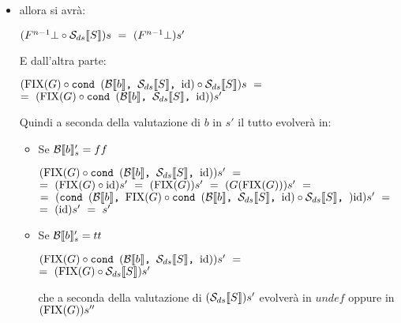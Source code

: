 {\begin{itemize}
\begin{itemize}
			\item {} allora si avrà:
			\begin{center}
			$(F^{n-1}\bot{} \circ \Sds{})s~=~(F^{n-1}\bot{})s'$
			\end{center}
			E dall'altra parte:
			\begin{center}
			$(\fixp{G} \circ \cond{b}{\Sds{}}{\idDS} \circ{} \Sds{})s~=$\\
			$=~(\fixp{G} \circ \cond{b}{\Sds{}}{\idDS})s'$
			\end{center}
			Quindi a seconda della valutazione di $b$ in $s'$ il tutto evolverà
			in:
			\begin{itemize}
			\item Se $\evalBbs{b}{s'}=ff$
			\begin{center}
			$(\fixp{G} \circ \cond{b}{\Sds{}}{\idDS})s'~=$\\
			$=~(\fixp{G} \circ \idDS)s'~=~(\fixp{G})s'~=~(G(\fixp{G}))s'~=$\\
			$=~(\cond{b}{\fixp{G} \circ \cond{b}{\Sds{}}{\idDS} \circ{} \Sds{}}
			{\idDS})s'~=$\\$=~(\idDS)s'~=~s'$
			\end{center}

			\item Se $\evalBbs{b}{s'}=tt$
			\begin{center}
			$(\fixp{G} \circ \cond{b}{\Sds{}}{\idDS})s'~=$\\
			$=~(\fixp{G} \circ \Sds{})s'$
			\end{center}
			che a seconda della valutazione di $(\Sds{})s'$ evolverà in $undef$
			oppure in $(\fixp{G})s''$
			\end{itemize}


\end{itemize}
\end{itemize}}
